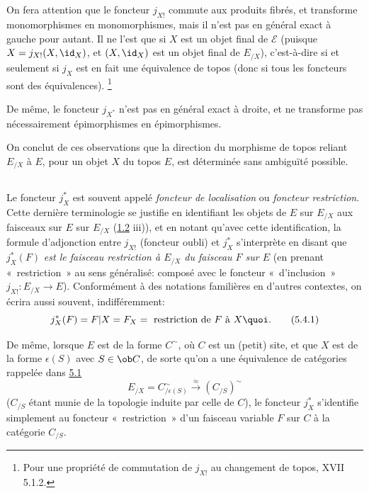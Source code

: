 \documentclass[10pt]{../fichiers-configuration-latex/smfart}
\begin{document}
\subsection{}
On fera attention que le foncteur $j_{X!}$ commute aux produits
fibrés, et transforme monomorphismes en monomorphismes, mais il
n'est pas en général exact à gauche pour autant. Il ne l'est
que si $X$ est un objet final de $ℰ$ (puisque
$X=j_{X!}(X,\id_X)$, et $(X,\id_X)$ est un objet final de $E_{/X}$),
c'est-à-dire si et seulement si $j_X$ est en fait une
équivalence de topos (donc si tous les foncteurs 
sont des équivalences). \footnote[1]{Pour une propriété de
commutation de $j_{X!}$ au changement de topos, \cf XVII 5.1.2.}

De même, le foncteur $j_{X^{\ast}}$ n'est pas en général exact
à droite, et ne transforme pas nécessairement épimorphismes en
épimorphismes.

On conclut de ces observations que la direction du morphisme de
topos reliant $E_{/X}$ à $E$, pour un objet $X$ du topos $E$, est
déterminée sans ambiguïté possible.

\subsection{}
Le foncteur $j^{\ast}_X$ est souvent appelé \emph{foncteur de
localisation} ou \emph{foncteur restriction}. Cette dernière
terminologie se justifie en identifiant les objets de $E$ \resp sur
$E_{/X}$ aux faisceaux sur $E$ \resp sur $E_{/X}$ (\hyperref[IV.theo1.2]{1.2}
iii)), et en notant qu'avec cette identification, la formule
d'adjonction entre $j_{X!}$ (foncteur oubli) et $j^{\ast}_X$
s'interprète en disant que $j^{\ast}_X(F)$ \emph{est\pageoriginale
le faisceau restriction à $E_{/X}$ du faisceau $F$ sur $E$} (en
prenant « restriction »  au sens généralisé: composé avec le
foncteur « d'inclusion » $j_{X!}:E_{/X}\rightarrow E$).
Conformément à des notations familières en d'autres contextes, on
écrira aussi souvent, indifféremment:
\begin{equation*}
j^{\ast}_X(F)=F| X=F_X=\mbox{ restriction de } F\mbox{ à }
X{\quoi}.\tag{5.4.1}
\end{equation*}

De même, lorsque $E$ est de la forme $C^{\sim}$, où $C$ est un
(petit) site, et que $X$ est de la forme $\epsilon(S)$ avec $S\in
\ob C$, de sorte qu'on a une équivalence de catégories rappelée dans
\hyperref[IV.subsec5.1]{5.1}
$$
E_{/X}=C^{\sim}_{/\epsilon(S)}\xrightarrow{\approx}(C_{/S})^{\sim}
$$
($C_{/S}$ étant munie de la topologie induite par celle de $C$),
le foncteur $j^{\ast}_X$ s'identifie simplement au foncteur « restriction »  d'un faisceau variable $F$ sur $C$ à la
catégorie $C_{/S}$.
\end{document}
